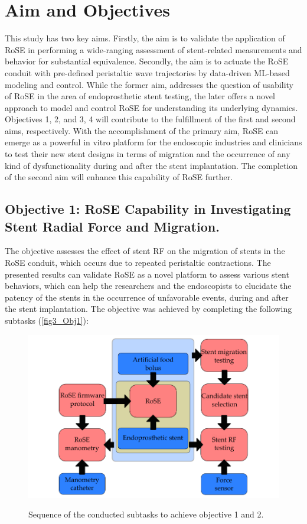 \section{Aim and Objectives}

This study has two key aims. Firstly, the aim is to validate the application of \ac{RoSE} in performing a wide-ranging assessment of stent-related measurements and behavior for substantial equivalence. Secondly, the aim is to actuate the \ac{RoSE} conduit with pre-defined peristaltic wave trajectories by data-driven ML-based modeling and control. While the former aim, addresses the question of usability of \ac{RoSE} in the area of endoprosthetic stent testing, the later offers a novel approach to model and control \ac{RoSE} for understanding its underlying dynamics.  Objectives 1, 2, and 3, 4 will contribute to the fulfillment of the first and second aims, respectively.  With the accomplishment of the primary aim, \ac{RoSE} can emerge as a powerful in vitro platform for the endoscopic industries and clinicians to test their new stent designs in terms of migration and the occurrence of any kind of dysfunctionality during and after the stent implantation. The completion of the second aim will enhance this capability of \ac{RoSE} further. 

\subsection{Objective 1: RoSE Capability in Investigating Stent Radial Force and Migration.}

The objective assesses the effect of stent \ac{RF} on the migration of stents in the \ac{RoSE} conduit, which occurs due to repeated peristaltic contractions. The presented results can validate \ac{RoSE} as a novel platform to assess various stent behaviors, which can help the researchers and the endoscopists to elucidate the patency of the stents in the occurrence of unfavorable events, during and after the stent implantation. The objective was achieved by completing the following subtasks (\autoref{fig3_Obj1}):

\begin{figure}[bth]
	\myfloatalign
	{\includegraphics[width=\linewidth]{images/Ch1/fig3_Obj1}} \quad
	\caption[Sequence of the conducted subtasks to achieve objective 1 and 2.]{Sequence of the conducted subtasks to achieve objective 1 and 2.}\label{fig3_Obj1}
\end{figure}

